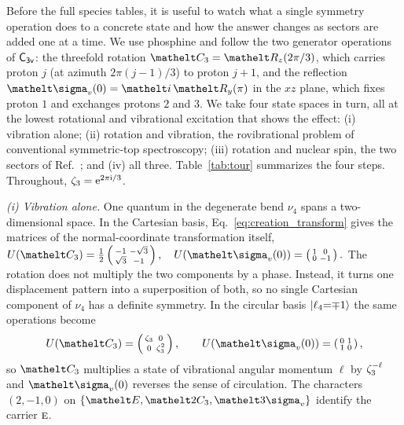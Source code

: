 Before the full species tables, it is useful to watch what a single symmetry operation does to a concrete state and how the answer changes as sectors are added one at a time. We use phosphine and follow the two generator operations of $\mathsf{C_{3v}}$: the threefold rotation $\elt{C_{3}}=\rotax{z}(2\pi/3)$, which carries proton $j$ (at azimuth $2\pi(j-1)/3$) to proton $j+1$, and the reflection $\elt{\sigma_{v}}(0)=\elt{i}\,\rotax{y}(\pi)$ in the $xz$ plane, which fixes proton $1$ and exchanges protons $2$ and $3$. We take four state spaces in turn, all at the lowest rotational and vibrational excitation that shows the effect: (i) vibration alone; (ii) rotation and vibration, the rovibrational problem of conventional symmetric-top spectroscopy; (iii) rotation and nuclear spin, the two sectors of Ref.~\cite{albert2025quantumtheorymolecularorientations}; and (iv) all three. Table~\ref{tab:tour} summarizes the four steps. Throughout, $\zeta_{3}=\mathrm{e}^{2\pi\mathrm{i}/3}$.

\emph{(i) Vibration alone.} One quantum in the degenerate bend $\nu_4$ spans a two-dimensional space. In the Cartesian basis, Eq.~\eqref{eq:creation_transform} gives the matrices of the normal-coordinate transformation itself, 
$U(\elt{C_{3}})
=
\frac12\left(\begin{smallmatrix}-1&-\sqrt3\\ \sqrt3&-1\end{smallmatrix}\right),\quad
U(\elt{\sigma_{v}}(0))=\left(\begin{smallmatrix}1&0\\0&-1\end{smallmatrix}\right).$
The rotation does not multiply the two components by a phase. Instead, it turns one displacement pattern into a superposition of both, so no single Cartesian component of $\nu_4$ has a definite symmetry. In the circular basis $\ket{\ell_4{=}{\mp1}}$ the same operations become
\begin{equation}
U(\elt{C_{3}})=\left(\begin{smallmatrix}\rootunity{3}&0\\0&\rootunity{3}^{2}\end{smallmatrix}\right),\qquad
U(\elt{\sigma_{v}}(0))=\left(\begin{smallmatrix}0&1\\1&0\end{smallmatrix}\right),
\label{eq:tour_vib_circ}
\end{equation}
so $\elt{C_{3}}$ multiplies a state of vibrational angular momentum $\ell$ by $\zeta_{3}^{-\ell}$ and $\elt{\sigma_{v}}(0)$ reverses the sense of circulation. The characters $(2,-1,0)$ on $\{\cls{E},\cls{2C_{3}},\cls{3\sigma_{v}}\}$ identify the carrier $\text{\normalfont\scshape e}$. 


